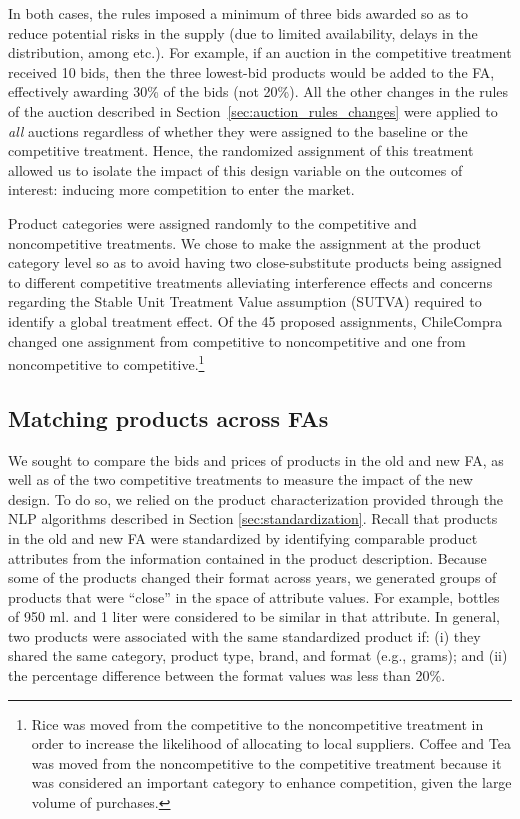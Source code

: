 In both cases, the rules imposed a minimum of three bids awarded so as to reduce potential risks in the supply (due to limited availability, delays in the distribution, among etc.). For example, if an auction in the competitive treatment received 10 bids, then the three lowest-bid products would be added to the FA, effectively awarding  30\% of the bids (not 20\%). All the other changes in the rules of the auction described in Section~\ref{sec:auction_rules_changes} were applied to \textit{all} auctions regardless of whether they were assigned to the baseline or the competitive treatment. Hence, the randomized assignment of this treatment allowed us to isolate the impact of this design variable on the outcomes of interest: inducing more competition to enter the market. 

Product categories were assigned randomly to the competitive and noncompetitive treatments. We chose to make the assignment at the product category level so as to avoid having two close-substitute products being assigned to different competitive treatments alleviating interference effects and concerns regarding {the Stable Unit Treatment Value assumption (SUTVA) required to identify a global treatment effect.} Of the 45 proposed assignments, ChileCompra changed one assignment from competitive to noncompetitive and one from noncompetitive to competitive.\footnote{Rice was moved from the competitive to the noncompetitive treatment in order to increase the likelihood of allocating to local suppliers. Coffee and Tea was moved from the noncompetitive to 
 the competitive treatment because it was considered an important category to enhance competition, given the large volume of purchases.}

 \subsection{Matching products across FAs}\label{subsec:matching}

 We sought to compare the bids and prices of products in the old and new FA, as well as of the two competitive treatments to measure the impact of the new design. {To do so, we relied on the product characterization provided through the NLP algorithms described in Section \ref{sec:standardization}. Recall that products in the old and new FA were standardized by identifying comparable product attributes from the information contained in the product description. Because some of the products changed their format across years, we generated groups of products that were ``close'' in the space of attribute values. For example, bottles of 950 ml. and 1 liter were considered to be similar in that attribute. In general, two products were associated with the same standardized product if: (i) they shared the same category, product type, brand, and format (e.g., grams); and (ii) the percentage difference between the format values was less than 20\%. }
 

